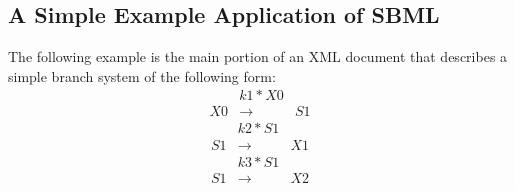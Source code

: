 \documentclass[10pt]{cek-article}
\begin{document}
\subsection{A Simple Example Application of SBML}

The following example is the main portion of an XML document that
describes a simple branch system of the following form:
\[
\begin{array}{ccc}
  & {k1 * X0}\\
  X0 & \longrightarrow & S1
\end{array}
\]
\[
\begin{array}{ccc}
  & {k2 * S1}\\
  S1 & \longrightarrow & X1
\end{array}
\]
\[
\begin{array}{ccc}
  & {k3 * S1}\\
  S1 & \longrightarrow & X2
\end{array}
\]
\end{document}
